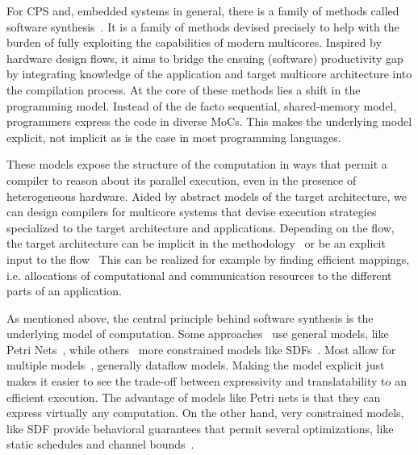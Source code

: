 For \ac{CPS} and, embedded systems in general, there is a family of methods called software synthesis~\cite{ritz1992softwaresynthesis,abbott1993softwaresynthesis,lin1998softwaresynthesis,bhartacharyya2000softwaresynthesis,pino1995softwaresynthesis,castrillon2011trends,bhattacharyya2012softwaresynthesis}.
It is a family of methods devised precisely to help with the burden of fully exploiting the capabilities of modern multicores.
Inspired by hardware design flows, it aims to bridge the ensuing (software) productivity gap by integrating knowledge of the application and target multicore architecture into the compilation process.
At the core of these methods lies a shift in the programming model.
Instead of the de facto sequential, shared-memory model, programmers express the code in diverse \acp{MoC}.
This makes the underlying model explicit, not implicit as is the case in most programming languages.

These models expose the structure of the computation in ways that permit a compiler to reason about its parallel execution, even in the presence of heterogeneous hardware.
Aided by abstract models of the target architecture, we can design compilers for multicore systems that devise execution strategies specialized to the target architecture and applications.
Depending on the flow, the target architecture can be implicit in the methodology~\cite{ritz1992softwaresynthesis} or be an explicit input to the flow~\cite{maps}
This can be realized for example by finding efficient mappings, i.e. allocations of computational and communication resources to the different parts of an application.

As mentioned above, the central principle behind software synthesis is the underlying model of computation. 
Some approaches~\cite{lin1998softwaresynthesis} use general models, like Petri Nets~\cite{petri1962nets}, while others~\cite{ritz1992softwaresynthesis} more constrained models like \acp{SDF}~\cite{lee1987sdf}.
Most allow for multiple models~\cite{bhartacharyya2000softwaresynthesis,pino1995softwaresynthesis,bhattacharyya2012softwaresynthesis}, generally dataflow models.
Making the model explicit just makes it easier to see the trade-off between expressivity and translatability to an efficient execution.
The advantage of models like Petri nets is that they can express virtually any computation.
On the other hand, very constrained models, like \ac{SDF} provide behavioral guarantees that permit several optimizations, like static schedules and channel bounds~\cite{Parks:M95:105}.


